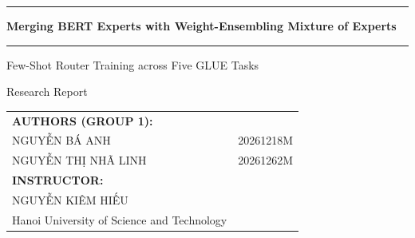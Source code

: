 \thispagestyle{empty}
\vspace*{4mm}

\noindent\textcolor{NavyBlue}{\rule{\linewidth}{1pt}}
\begin{center}
	\fontsize{30}{36} \color{NavyBlue} \selectfont
	\textbf{Merging BERT Experts with Weight-Ensembling Mixture of Experts}
\end{center}

\noindent\textcolor{NavyBlue}{\rule{\linewidth}{1pt}}

\begin{center}
	\fontsize{17}{21} \selectfont
	Few-Shot Router Training across Five GLUE Tasks
\end{center}

\vspace*{2mm}
\begin{center}
	\fontsize{14}{14} \selectfont Research Report
\end{center}
\vspace*{6mm}

\begin{center}
	\def\baselinestretch{1.0}\color{NavyBlue}
	{\fontsize{13}{13} \selectfont
		\begin{tabular}{l l}
			{\bf AUTHORS (GROUP 1):} & \\[4mm]
			\hspace{13mm} NGUYỄN BÁ ANH & 20261218M\\[3mm]
			\hspace{13mm} NGUYỄN THỊ NHÃ LINH & 20261262M\\[6mm]
			{\bf INSTRUCTOR:} & \\[4mm]
			\hspace{13mm} NGUYỄN KIÊM HIẾU & \\[6mm]
			\hspace{13mm} Hanoi University of Science and Technology & \\[3mm]
	\end{tabular}}
\end{center}

